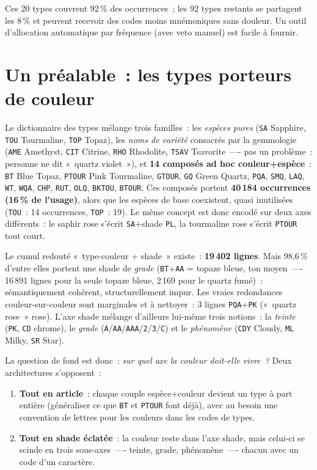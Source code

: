 \documentclass[11pt,a4paper]{article}
\newcommand{\code}[1]{\texttt{#1}}
\begin{document}
Ces 20 types couvrent 92\,\% des occurrences~; les 92 types restants se
partagent les 8\,\% et peuvent recevoir des codes moins mnémoniques sans
douleur. Un outil d'allocation automatique par fréquence (avec veto manuel)
est facile à fournir.

\section{Un préalable~: les types porteurs de couleur}

Le dictionnaire des types mélange trois familles~: les \emph{espèces pures}
(\code{SA} Sapphire, \code{TOU} Tourmaline, \code{TOP} Topaz), les
\emph{noms de variété} consacrés par la gemmologie (\code{AME} Amethyst,
\code{CIT} Citrine, \code{RHO} Rhodolite, \code{TSAV} Tsavorite~—- pas un
problème~: personne ne dit «~quartz violet~»), et \textbf{14 composés
ad hoc couleur+espèce}~: \code{BT} Blue Topaz, \code{PTOUR} Pink
Tourmaline, \code{GTOUR}, \code{GQ} Green Quartz, \code{PQA}, \code{SMQ},
\code{LAQ}, \code{WT}, \code{WQA}, \code{CHP}, \code{RUT}, \code{OLQ},
\code{BKTOU}, \code{BTOUR}. Ces composés portent \textbf{40\,184
occurrences (16\,\% de l'usage)}, alors que les espèces de base
coexistent, quasi inutilisées (\code{TOU}~: 14 occurrences, \code{TOP}~:
19). Le même concept est donc encodé sur deux axes différents~: le saphir
rose s'écrit \code{SA}+shade \code{PL}, la tourmaline rose s'écrit
\code{PTOUR} tout court.

Le cumul redouté «~type-couleur + shade~» existe~: \textbf{19\,402
lignes}. Mais 98,6\,\% d'entre elles portent une shade de \emph{grade}
(\code{BT}+\code{AA} = topaze bleue, ton moyen~—- 16\,891 lignes pour la
seule topaze bleue, 2\,169 pour le quartz fumé)~: sémantiquement cohérent,
structurellement impur. Les vraies redondances couleur-sur-couleur sont
marginales et à nettoyer~: 3 lignes \code{PQA}+\code{PK} («~quartz rose~»
rose). L'axe shade mélange d'ailleurs lui-même trois notions~: la
\emph{teinte} (\code{PK}, \code{CD} chrome), le \emph{grade}
(\code{A}/\code{AA}/\code{AAA}/\code{2}/\code{3}/\code{C}) et le
\emph{phénomène} (\code{CDY} Cloudy, \code{ML} Milky, \code{SR} Star).

La question de fond est donc~: \emph{sur quel axe la couleur doit-elle
vivre~?} Deux architectures s'opposent~:

\begin{enumerate}
\item \textbf{Tout en article}~: chaque couple espèce+couleur devient un
  type à part entière (généraliser ce que \code{BT} et \code{PTOUR} font
  déjà), avec au besoin une convention de lettres pour les couleurs dans
  les codes de types.
\item \textbf{Tout en shade éclatée}~: la couleur reste dans l'axe shade,
  mais celui-ci se scinde en trois sous-axes~—- teinte, grade,
  phénomène~—- chacun avec un code d'un caractère.
\end{enumerate}
\end{document}
